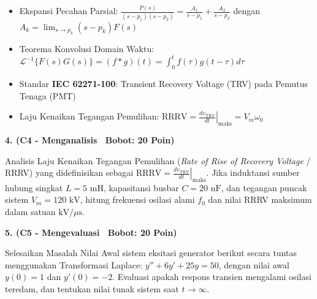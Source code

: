 \documentclass[10pt,a4paper]{article}
\begin{document}
\vfill

\begin{tcolorbox}[colback=unibblue!3,colframe=unibblue,colbacktitle=unibblue,coltitle=white,boxrule=0.6pt,arc=2pt,left=6pt,right=6pt,top=3pt,bottom=3pt,title=\textbf{\scriptsize FORMULA RUJUKAN TEKNIS \& STANDAR INDUSTRI TERKAIT}]
  \scriptsize
  \begin{itemize}[leftmargin=*, nosep]
  \item Ekspansi Pecahan Parsial: $\frac{P(s)}{(s-p_1)(s-p_2)} = \frac{A_1}{s-p_1} + \frac{A_2}{s-p_2}$ dengan $A_k = \lim_{s\to p_k}(s-p_k)F(s)$
  \item Teorema Konvolusi Domain Waktu: $\mathcal{L}^{-1}\{F(s)G(s)\} = (f * g)(t) = \int_0^t f(\tau) g(t-\tau) d\tau$
  \item Standar \textbf{IEC 62271-100}: Transient Recovery Voltage (TRV) pada Pemutus Tenaga (PMT)
  \item Laju Kenaikan Tegangan Pemulihan: $\text{RRRV} = \left. \frac{dv_{\text{TRV}}}{dt} \right|_{\text{maks}} = V_m \omega_0$
\end{itemize}
\end{tcolorbox}

\newpage

\par
\vspace{1mm}

\noindent\textbf{4. (C4 - Menganalisis \textbar\ Bobot: 20 Poin)}\par\vspace{0.8mm}
{\footnotesize Analisis Laju Kenaikan Tegangan Pemulihan (\textit{Rate of Rise of Recovery Voltage} / RRRV) yang didefinisikan sebagai $\text{RRRV} = \left. \frac{dv_{\text{TRV}}}{dt} \right|_{\text{maks}}$. Jika induktansi sumber hubung singkat $L = 5\text{ mH}$, kapasitansi busbar $C = 20\text{ nF}$, dan tegangan puncak sistem $V_m = 120\text{ kV}$, hitung frekuensi osilasi alami $f_0$ dan nilai RRRV maksimum dalam satuan $\text{kV/}\mu\text{s}$.}\par

\vspace{3.5mm}

\noindent\textbf{5. (C5 - Mengevaluasi \textbar\ Bobot: 20 Poin)}\par\vspace{0.8mm}
{\footnotesize Selesaikan Masalah Nilai Awal sistem eksitasi generator berikut secara tuntas menggunakan Transformasi Laplace: $y'' + 6y' + 25y = 50$, dengan nilai awal $y(0) = 1$ dan $y'(0) = -2$. Evaluasi apakah respons transien mengalami osilasi teredam, dan tentukan nilai tunak sistem saat $t \to \infty$.}\par
\end{document}
